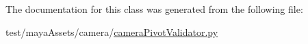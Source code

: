 \-The documentation for this class was generated from the following file\-:\begin{DoxyCompactItemize}
\item 
test/maya\-Assets/camera/\hyperlink{cameraPivotValidator_8py}{camera\-Pivot\-Validator.\-py}\end{DoxyCompactItemize}
